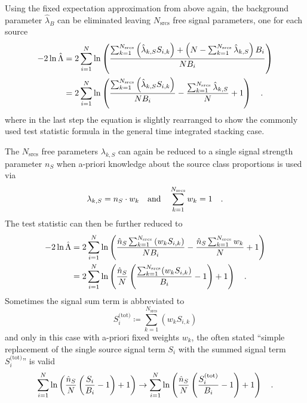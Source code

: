 Using the fixed expectation approximation from above again, the background parameter $\hat{\lambda}_B$ can be eliminated leaving $N_\text{srcs}$ free signal parameters, one for each source
\begin{align}
  -2\ln\hat{\Lambda}
  &= 2\sum_{i=1}^N \ln\left(
    \frac{\sum_{k=1}^{N_\text{srcs}}\left(\hat{\lambda}_{k,S} S_{i,k}\right) +
          \left(
            N - \sum_{k=1}^{N_\text{srcs}}\hat{\lambda}_{k,S}
          \right) B_i}{N B_i} \right) \\
  &= 2\sum_{i=1}^N \ln\left(
      \frac{\sum_{k=1}^{N_\text{srcs}}\left(\hat{\lambda}_{k,S}
              S_{i,k}\right)}{N B_i} -
      \frac{\sum_{k=1}^{N_\text{srcs}}\hat{\lambda}_{k,S}}{N} + 1
    \right)
  \quad\text{.}
\end{align}
where in the last step the equation is slightly rearranged to show the commonly used test statistic formula in the general time integrated stacking case.

The $N_\text{srcs}$ free parameters $\lambda_{k,S}$ can again be reduced to a single signal strength parameter $n_S$ when a-priori knowledge about the source class proportions is used via
\begin{equation}
  \lambda_{k,S} = n_S \cdot w_k
  \quad\text{and}\quad
  \sum_{k=1}^{N_\text{srcs}} w_k = 1
  \quad\text{.}
\end{equation}
The test statistic can then be further reduced to
\begin{align}
  -2\ln\hat{\Lambda}
  &= 2\sum_{i=1}^N \ln\left(
        \frac{\hat{n}_S \sum_{k=1}^{N_\text{srcs}}\left(w_k S_{i,k}\right)}
             {N B_i} -
        \frac{\hat{n}_S \sum_{k=1}^{N_\text{srcs}}w_k}{N} + 1
      \right) \\
  &= 2\sum_{i=1}^N \ln\left(
        \frac{\hat{n}_S}{N}\left(
          \frac{\sum_{k=1}^{N_\text{srcs}}(w_k S_{i,k})}{B_i} - 1
        \right) + 1
      \right)
  \quad\text{.}
\end{align}
Sometimes the signal sum term is abbreviated to
\begin{equation}
  S_i^\text{(tot)} \coloneqq \sum_{k=1}^{N_\text{srcs}}\left(w_k S_{i,k}\right)
\end{equation}
and only in this case with a-priori fixed weights $w_k$, the often stated \enquote{simple replacement of the single source signal term $S_i$ with the summed signal term $S_i^\text{(tot)}$} is valid
\begin{equation}
  \sum_{i=1}^N \ln\left(
      \frac{\hat{n}_S}{N}\left( \frac{S_i}{B_i} - 1 \right) + 1
    \right)
  \rightarrow
  \sum_{i=1}^N \ln\left(
      \frac{\hat{n}_S}{N}\left( \frac{S_i^\text{(tot)}}{B_i} - 1 \right) + 1
    \right)
  \quad\text{.}
\end{equation}

